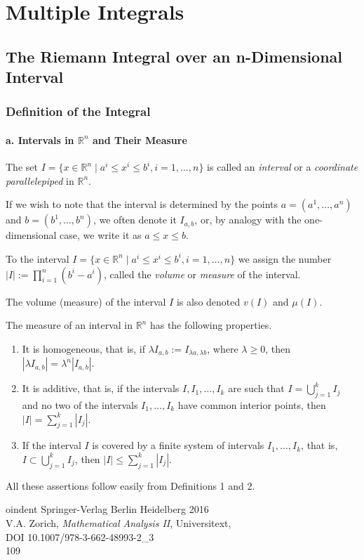 \documentclass{book}
\begin{document}
\chapter{Multiple Integrals}

\section{The Riemann Integral over an n-Dimensional Interval}
\subsection{Definition of the Integral}
\subsubsection*{a. Intervals in $\mathbb{R}^n$ and Their Measure}

\begin{definition}
The set $I = \{x \in \mathbb{R}^n \mid a^i \le x^i \le b^i, i = 1, \ldots, n\}$ is called an \emph{interval} or a \emph{coordinate parallelepiped} in $\mathbb{R}^n$.

If we wish to note that the interval is determined by the points $a = (a^1, \ldots, a^n)$ and $b = (b^1,\ldots,b^n)$, we often denote it $I_{a,b}$, or, by analogy with the one-dimensional case, we write it as $a \le x \le b$.
\end{definition}

\begin{definition}
To the interval $I = \{x \in \mathbb{R}^n \mid a^i \le x^i \le b^i, i = 1, \ldots, n\}$ we assign the number $|I| := \prod_{i=1}^n (b^i - a^i)$, called the \emph{volume} or \emph{measure} of the interval.

The volume (measure) of the interval $I$ is also denoted $v(I)$ and $\mu(I)$.
\end{definition}

\begin{lemma}
The measure of an interval in $\mathbb{R}^n$ has the following properties.
\begin{enumerate}
    \item[(a)] It is homogeneous, that is, if $\lambda I_{a,b} := I_{\lambda a, \lambda b}$, where $\lambda \ge 0$, then $|\lambda I_{a,b}| = \lambda^n |I_{a,b}|$.
    \item[(b)] It is additive, that is, if the intervals $I, I_1, \ldots, I_k$ are such that $I = \bigcup_{j=1}^k I_j$ and no two of the intervals $I_1,\ldots, I_k$ have common interior points, then $|I| = \sum_{j=1}^k|I_j|$.
    \item[(c)] If the interval $I$ is covered by a finite system of intervals $I_1, \ldots, I_k$, that is, $I \subset \bigcup_{j=1}^k I_j$, then $|I| \le \sum_{j=1}^k|I_j|$.
\end{enumerate}
All these assertions follow easily from Definitions 1 and 2.
\end{lemma}


oindent
Springer-Verlag Berlin Heidelberg 2016\\
V.A. Zorich, \emph{Mathematical Analysis II}, Universitext,\\
DOI 10.1007/978-3-662-48993-2\_3\\
109
\end{document}
